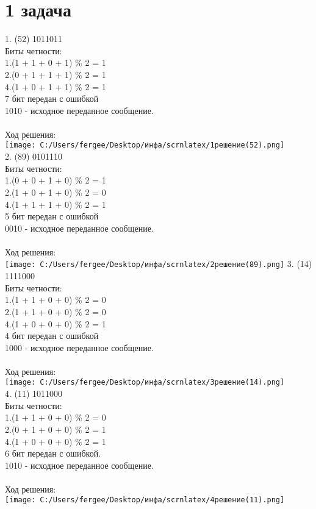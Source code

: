 \documentclass[a4paper]{article}
\begin{document}
\section{1 задача}
1. (52)  1011011 \\
   Биты четности:\\
   1.(1 + 1 + 0 + 1) \% 2 = 1\\
   2.(0 + 1 + 1 + 1) \% 2 = 1\\
   4.(1 + 0 + 1 + 1) \% 2 = 1\\
   7 бит передан с ошибкой \\
   1010 - исходное переданное сообщение. \\ 
\\
Ход решения:
\\
\texttt{[image: C:/Users/fergee/Desktop/инфа/scrnlatex/1решение(52).png]}
\\
2. (89) 0101110 \\
   Биты четности: \\
   1.(0 + 0 + 1 + 0) \% 2 = 1\\
   2.(1 + 0 + 1 + 0) \% 2 = 0\\
   4.(1 + 1 + 1 + 0) \% 2 = 1\\
   5 бит передан с ошибкой \\
   0010 - исходное переданное сообщение. \\
\\
Ход решения:
\\
\texttt{[image: C:/Users/fergee/Desktop/инфа/scrnlatex/2решение(89).png]}
3. (14) 1111000\\
   Биты четности: \\
   1.(1 + 1 + 0 + 0) \% 2 = 0\\
   2.(1 + 1 + 0 + 0) \% 2 = 0\\
   4.(1 + 0 + 0 + 0) \% 2 = 1\\
   4 бит передан с ошибкой \\
  1000 - исходное переданное сообщение. \\
\\
Ход решения:
\\
\texttt{[image: C:/Users/fergee/Desktop/инфа/scrnlatex/3решение(14).png]}
\\
4. (11) 1011000\\
   Биты четности: \\
   1.(1 + 1 + 0 + 0) \% 2 = 0\\
   2.(0 + 1 + 0 + 0) \% 2 = 1\\
   4.(1 + 0 + 0 + 0) \% 2 = 1\\
   6 бит передан с ошибкой. \\
   1010 - исходное переданное сообщение. \\
\\
Ход решения:
\\
\texttt{[image: C:/Users/fergee/Desktop/инфа/scrnlatex/4решение(11).png]}
\\
\newpage
\end{document}
